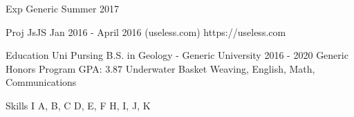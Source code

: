 \documentclass[11pt,letterpaper]{article}
\begin{document}

\def\rheader {
\begin{minipage}[b]{0.33333\textwidth}
\raggedright
{\HUGE John Doe}
\end{minipage}%
\begin{minipage}[b]{0.33333\textwidth}
\centering
\href{mailto:johndoe@example.com}{johndoe@example.com} \par
$512$-$582$-$921$
\end{minipage}%
\begin{minipage}[b]{0.33333\textwidth}
\raggedleft
\href{https://github.com/example}{github.com/example} \par
\href{https://linkedin.com/example}{linkedin.com/example} \par
\end{minipage}
\vspace{8px}
}


\begin{rgrp}{Exp Generic}
{Summer 2017}
\end{rgrp}


\begin{rgrp}{Proj JsJS}
{Jan 2016 - April 2016}
{(useless.com)}
{https://useless.com}
\end{rgrp}

\begin{rgrp}{Education Uni}
\redu
{Pursing B.S. in Geology - Generic University}
{2016 - 2020}
{Generic Honors Program}
{GPA: $3.87$}
{Underwater Basket Weaving, English, Math, Communications}
\end{rgrp}

\begin{rgrp}{Skills I}
\rskills
{A, B, C}
{D, E, F}
{H, I, J, K}
\end{rgrp}
\end{document}
